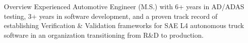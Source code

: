 \documentclass{resume} %
\begin{document}
	
	
%	
	
	
 		\fontsize{11pt}{12pt}\selectfont
		\begin{rSection}{Overview}
					\vspace{2mm}
				Experienced Automotive Engineer (M.S.) with 6+ years in AD/ADAS testing, 3+ years in software development, and a proven track record of establishing Verification \& Validation frameworks for SAE L4 autonomous truck software in an organization transitioning from R\&D to production.
			\end{rSection}
		\vspace{2mm}
		
\end{document}
